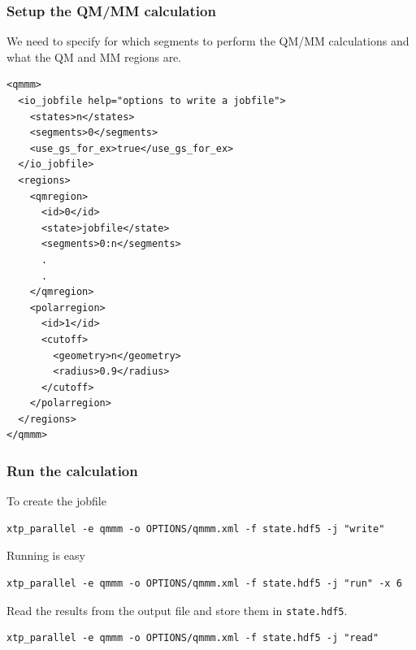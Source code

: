 \documentclass[t,aspectratio=169, 8pt]{beamer}
\begin{document}
\begin{frame}[fragile]
  \frametitle{Setup the QM/MM calculation}
  We need to specify for which segments to perform the QM/MM calculations and what the QM and MM regions are.
  \begin{verbatim}
<qmmm>
  <io_jobfile help="options to write a jobfile">
    <states>n</states>
    <segments>0</segments>
    <use_gs_for_ex>true</use_gs_for_ex>
  </io_jobfile>
  <regions>
    <qmregion>
      <id>0</id>
      <state>jobfile</state>
      <segments>0:n</segments>
      .
      .
    </qmregion>
    <polarregion>
      <id>1</id>
      <cutoff>
        <geometry>n</geometry>
        <radius>0.9</radius>
      </cutoff>
    </polarregion>
  </regions>
</qmmm>
  \end{verbatim}

\end{frame}

\begin{frame}[fragile]
  \frametitle{Run the calculation}
  To create the jobfile
  \begin{verbatim}
xtp_parallel -e qmmm -o OPTIONS/qmmm.xml -f state.hdf5 -j "write"
  \end{verbatim}
  Running is easy
  \begin{verbatim}
xtp_parallel -e qmmm -o OPTIONS/qmmm.xml -f state.hdf5 -j "run" -x 6
  \end{verbatim}
  Read the results from the output file and store them in \texttt{state.hdf5}.
  \begin{verbatim}
xtp_parallel -e qmmm -o OPTIONS/qmmm.xml -f state.hdf5 -j "read"
  \end{verbatim}

\end{frame}
\end{document}
